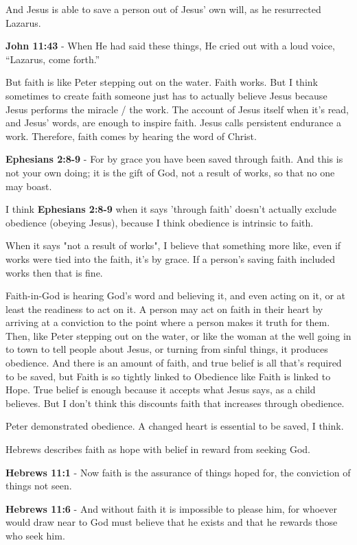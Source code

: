 \documentclass[11pt]{article}
\begin{document}
And Jesus is able to save a person out of Jesus' own will, as he resurrected Lazarus.

\textbf{John 11:43} - When He had said these things, He cried out with a loud voice, “Lazarus, come forth.”

But faith is like Peter stepping out on the water. Faith works. But I think sometimes to create faith someone just has to actually believe Jesus because Jesus performs the miracle / the work. The account of Jesus itself when it's read, and Jesus' words, are enough to inspire faith. Jesus calls persistent endurance a work. Therefore, faith comes by hearing the word of Christ.

\textbf{Ephesians 2:8-9} - For by grace you have been saved through faith. And this is not your own doing; it is the gift of God, not a result of works, so that no one may boast.

I think \textbf{Ephesians 2:8-9} when it says 'through faith' doesn't actually exclude obedience (obeying Jesus), because I think obedience is intrinsic to faith.

When it says "not a result of works", I believe that something more like, even if works were tied into the faith, it's by grace. If a person's saving faith included works then that is fine.

Faith-in-God is hearing God's word and believing it, and even acting on it, or at least the readiness to act on it.
A person may act on faith in their heart by arriving at a conviction to the point where a person makes it truth for them.
Then, like Peter stepping out on the water, or like the woman at the well going in to town to tell people about Jesus, or turning from sinful things, it produces obedience.
And there is an amount of faith, and true belief is all that's required to be saved, but Faith is so tightly linked to Obedience like Faith is linked to Hope. True belief is enough because it accepts what Jesus says, as a child believes. But I don't think this discounts faith that increases through obedience.

Peter demonstrated obedience. A changed heart is essential to be saved, I think.

Hebrews describes faith as hope with belief in reward from seeking God.

\textbf{Hebrews 11:1} - Now faith is the assurance of things hoped for, the conviction of things not seen.

\textbf{Hebrews 11:6} - And without faith it is impossible to please him, for whoever would draw near to God must believe that he exists and that he rewards those who seek him.
\end{document}
